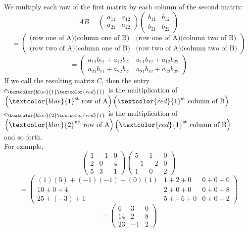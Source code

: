 \documentclass{ximera}
\begin{document}
 We multiply each row of the first matrix by
each column of the second matrix:
\[ AB = \left(\begin{array}{cc}
a_{11} & a_{12}\\
a_{21} & a_{22}
\end{array}\right) \left(\begin{array}{cc}
b_{11} & b_{12}\\
b_{21} & b_{22}
\end{array}\right)
\]
\[ = \left(\begin{array}{cc}
\text{(row one of A)(column one of B)} & \text{(row one of A)(column two of B)}\\
\text{(row two of A)(column one of B)} & \text{(row two of A)(column two of B)}
\end{array}\right) \]
\[ = \left(\begin{array}{cc}
a_{11}b_{11} + a_{12}b_{21} & a_{11}b_{12}+ a_{12}b_{22}\\
a_{21}b_{11} + a_{22}b_{21} & a_{21}b_{12} + a_{22}b_{22}
\end{array}\right)\]
If we call the resulting matrix $C$, then the entry \\
$c_{\textcolor{blue}{1}\textcolor{red}{1}}$ is the multiplication of $\left(\textcolor{blue}{1}^{\text{st}} \text{ row of A}\right)\left( \textcolor{red}{1}^{\text{st}} \text{ column of B}\right)$\\
$c_{\textcolor{blue}{2} \textcolor{red}{1}}$ is the multiplication of $\left(\textcolor{blue}{2}^{\text{nd}} \text{ row of A}\right)\left( \textcolor{red}{1}^{\text{st}} \text{ column of B}\right)$\\
and so forth. \\
For example,
\[\left(\begin{array}{ccc}
1 & -1 & 0\\
2 & 0 & 4 \\
5 & 3 & 1
\end{array}\right) \left(\begin{array}{ccc}
5 & 1 & 0\\
-1 & -2 & 0\\
1 & 0 & 2
\end{array}\right)\]
\[= \left(\begin{array}{ccc}
(1)(5) + (-1)(-1)+ (0)(1) & 1 + 2+ 0 & 0 + 0+ 0\\
10 + 0 + 4 & 2 + 0+0 & 0 + 0+8\\
25+ (-3) + 1 & 5 + -6+0 & 0 + 0+ 2
\end{array}\right)\]
\[= \left(\begin{array}{ccc}
6 & 3 & 0\\
14& 2 & 8\\
23 & -1 & 2
\end{array}\right)
\]
\end{document}
